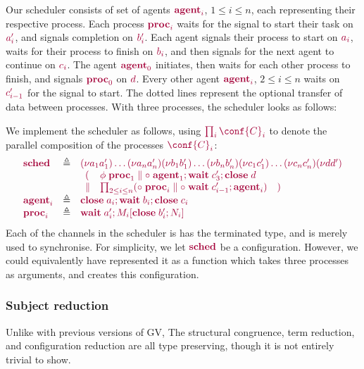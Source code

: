 \documentclass[main.tex]{subfiles}
\begin{document}
Our scheduler consists of set of agents $\tm{\agent{i}}$, $1\leq{i}\leq{n}$, each representing their respective process. Each process $\tm{\proc{i}}$ waits for the signal to start their task on $\tm{a'_i}$, and signals completion on $\tm{b'_i}$. Each agent signals their process to start on $\tm{a_i}$, waits for their process to finish on $\tm{b_i}$, and then signals for the next agent to continue on $\tm{c_i}$. The agent $\tm{\agent0}$ initiates, then waits for each other process to finish, and signals $\tm{\proc0}$ on $\tm{d}$. Every other agent $\tm{\agent{i}}$, $2\leq{i}\leq{n}$ waits on $\tm{c'_{i-1}}$ for the signal to start. The dotted lines represent the optional transfer of data between processes. With three processes, the scheduler looks as follows:

We implement the scheduler as follows, using $\tm{\prod_{i}\conf{C}_i}$ to denote the parallel composition of the processes $\tm{\conf{C}_i}$:
\[
  \begin{array}{lrlr}
    \tm{\sched}
    & \defeq & \tm{\res{a_1}{a'_1}{\dots{\res{a_n}{a'_n}{}}}}
               \tm{\res{b_1}{b'_1}{\dots{\res{b_n}{b'_n}{}}}}
               \tm{\res{c_1}{c'_1}{\dots{\res{c_n}{c'_n}{}}}}
               \tm{\res{d}{d'}{}}
    \\ &     & \tm{\begin{array}{lll}
                     (
                     & \phi\;\proc1
                     \parallel
                     \child\;\andthen{\agent1}{\andthen{\wait\;{c'_3}}{\close\;{d}}}
                     \\
                     \parallel
                     &
                     \prod_{2\leq{i}\leq{n}}
                     (\child\;\proc{i} \parallel \child\;\andthen{\wait\;{c'_{i-1}}}{\agent{i}})
                     & )
                   \end{array}}
    \\
    \tm{\agent{i}}
    & \defeq & \tm{\andthen{\close\;{a_i}}{\andthen{\wait\;{b_i}}{\close\;{c_i}}}}
    \\
    \tm{\proc{i}}
    & \defeq & \tm{\andthen{\wait\;{a'_i}}{\plug{M_i}{\andthen{\close\;{b'_i}}{N_i}}}}
  \end{array}
\]
Each of the channels in the scheduler is has the terminated type, and is merely used to synchronise.
For simplicity, we let $\tm{\sched}$ be a configuration. However, we could equivalently have represented it as a function which takes three processes as arguments, and creates this configuration.


\subsubsection*{Subject reduction}
Unlike with previous versions of GV, The structural congruence, term reduction, and configuration reduction are all type preserving, though it is not entirely trivial to show.
\end{document}
